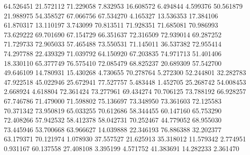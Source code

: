 64.526451
21.572112
71.229058
7.832953
16.608572
6.494844
4.599376
50.561879
21.988975
54.358527
67.066756
67.534270
4.165327
13.536353
17.384106
61.870317
13.110197
3.743099
70.813511
71.928351
71.685081
70.986993
73.629222
69.701690
67.154729
66.351637
72.316509
72.939014
69.287252
71.729733
72.905033
57.465488
73.550531
71.145011
36.537382
72.955414
74.297788
22.439329
71.039792
64.150920
67.203835
74.971713
51.401406
18.330110
65.377749
76.575410
72.085479
68.825237
20.689309
57.542700
49.646109
14.780931
15.430268
4.730655
70.278764
5.272300
52.244801
32.282783
47.922518
45.022946
25.672941
77.527757
5.483448
1.452705
25.268742
54.008453
2.668924
4.618804
72.361424
73.277961
69.434274
70.706125
73.788192
66.928257
67.746786
71.479000
71.598802
75.136697
73.348950
73.361603
72.125583
70.371342
73.950819
65.033255
70.612686
58.344455
60.147160
65.753290
72.408266
57.942532
58.412378
58.042731
70.252467
44.779052
68.955030
73.445946
53.700668
63.966627
14.039888
22.346193
76.886388
32.202377
63.179371
70.121974
1.078930
37.557527
21.625913
35.318012
11.579342
2.774951
0.931167
60.137558
27.408108
3.395199
4.571752
41.383691
14.282233
2.361470
